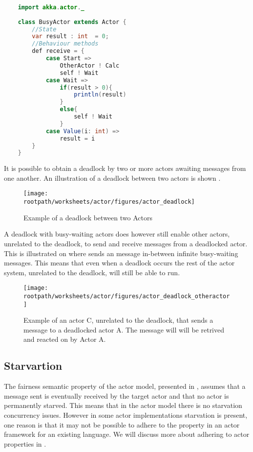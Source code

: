 \begin{lstlisting}[label=lst:actor_busywait,
  caption={Busy-waiting actor program written in the Scala Akka actor framework.},
  language=Java,  
  showspaces=false,
  showtabs=false,
  breaklines=true,
  showstringspaces=false,
  breakatwhitespace=true,
  commentstyle=\color{greencomments},
  keywordstyle=\color{bluekeywords},
  stringstyle=\color{redstrings}]  % Start your code-block
	
	import akka.actor._
	
	class BusyActor extends Actor {
		//State
		var result : int  = 0;
		//Behaviour methods
		def receive = {
			case Start =>
				OtherActor ! Calc
				self ! Wait
			case Wait =>
				if(result > 0){
					println(result)
				}
				else{
					self ! Wait
				}	
			case Value(i: int) =>
				result = i
		}
	}
\end{lstlisting}
It is possible to obtain a deadlock by two or more actors awaiting messages from one another. An illustration of a deadlock between two actors is shown .

\begin{figure}[ht!]
\centering
\texttt{[image: \\rootpath/worksheets/actor/figures/actor\_deadlock]}
\caption{Example of a deadlock between two Actors}\label{fig:actor_deadlock}
\end{figure}

A deadlock with busy-waiting actors does however still enable other actors, unrelated to the deadlock, to send and receive messages from a deadlocked actor. This is illustrated on  where  sends an  message in-between  infinite busy-waiting messages. This means that even when a deadlock occurs the rest of the actor system, unrelated to the deadlock, will still be able to run.

\begin{figure}[ht!]
\centering
\texttt{[image: \\rootpath/worksheets/actor/figures/actor\_deadlock\_otheractor]}
\caption{Example of an actor C, unrelated to the deadlock, that sends a message to a deadlocked actor A. The message will will be retrived and reacted on by Actor A.}\label{fig:actor_deadlock_otheractor}
\end{figure}

\subsection{Starvartion}
The fairness semantic property of the actor model, presented in , assumes that a message sent is eventually received by the target actor and that no actor is permanently starved. This means that in the actor model there is no starvation concurrency issues. However in some actor implementations starvation is present, one reason is that it may not be possible to adhere to the property in an actor framework for an existing language. We will discuss more about adhering to actor properties in .
